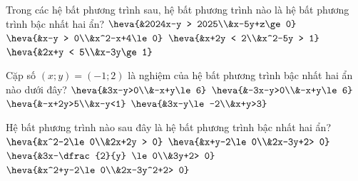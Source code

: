 

\begin{ex}%
	Trong các hệ bất phương trình sau, hệ bất phương trình nào là hệ bất phương trình bậc  nhất hai ẩn?
	\choice 
		{$\heva{&2024x-y > 2025\\&x-5y+z\ge  0}$}
		{$\heva{&x-y  > 0\\&x^2-x+4\le 0}$}
		{$\heva{&x+2y < 2\\&x^2-5y >  1}$}
		{\True  $\heva{&2x+y < 5\\&x-3y\ge 1}$}
\end{ex}

\begin{ex}%
	Cặp số $(x;y)=(-1;2)$ là nghiệm của hệ bất phương trình bậc nhất  hai ẩn nào dưới đây?
	 \choice
		{$\heva{&3x-y>0\\&-x+y\le 6}$} 
		{\True $\heva{&-3x-y>0\\&-x+y\le  6}$}
		 {$\heva{&-x+2y>5\\&x-y<1}$}
		{$\heva{&3x-y\le-2\\&x+y>3}$} 
\end{ex}

\begin{ex}%
	Hệ bất phương trình nào sau đây là hệ bất phương  trình bậc nhất hai ẩn?
	 \choice
		{$\heva{&x^2-2\le 0\\&2x+2y > 0}$} 
		{\True  $\heva{&x+y-2\le 0\\&2x-3y+2> 0}$}
		{$\heva{&3x-\dfrac{2}{y} \le 0\\&3y+2>  0}$}
		{$\heva{&x^2+y-2\le 0\\&2x-3y^2+2>  0}$}
\end{ex}


